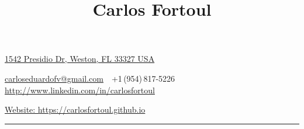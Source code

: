 \documentclass[letterpaper,MMMyyyy,nonstop]{simpleresumecv}
\newcommand{\CVAuthor}{Carlos Fortoul}
\newcommand{\CVWebpage}{http://www.linkedin.com/in/carlosfortoul}
\begin{document}

\title{\CVAuthor}
\begin{subtitle}
\href{https://www.google.com/maps/dir/''/1542+Presidio+Dr,+Weston,+FL+33327/data=!4m5!4m4!1m0!1m2!1m1!1s0x88d90a57450cc935:0x260f9cb86d3576bf?sa=X&ved=0ahUKEwisur3Ije3OAhVCHB4KHafxBEEQwwUIHTAA}
{1542 Presidio Dr, Weston, FL 33327 USA}
\par
\href{mailto:carloseduardofv@gmail.com}
{carloseduardofv@gmail.com}
\,\SubBulletSymbol\,
+1\,(954)\,817-5226
\,\SubBulletSymbol\,
\href{\CVWebpage}
{\CVWebpage}

\href{https://carlosfortoul.github.io}
{Website: https://carlosfortoul.github.io}

\rule{\textwidth}{1pt}
\end{subtitle}
\vspace{-5mm}
\end{document}
